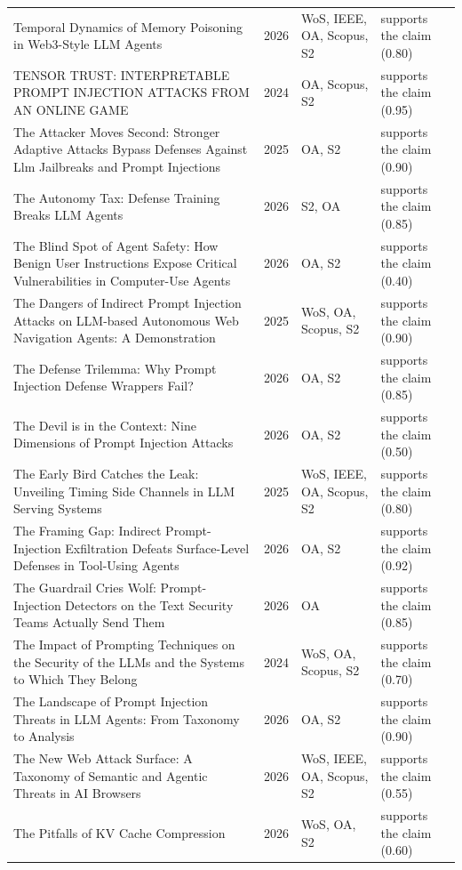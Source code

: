 \begin{longtable}{@{}%
  >{\raggedright\arraybackslash}p{}c%
  >{\raggedright\arraybackslash}p{}%
  >{\raggedright\arraybackslash}p{}@{}}
Temporal Dynamics of Memory Poisoning in Web3-Style LLM Agents & 2026 & WoS, IEEE, OA, Scopus, S2 & supports the claim (0.80) \\
TENSOR TRUST: INTERPRETABLE PROMPT INJECTION ATTACKS FROM AN ONLINE GAME & 2024 & OA, Scopus, S2 & supports the claim (0.95) \\
The Attacker Moves Second: Stronger Adaptive Attacks Bypass Defenses Against Llm Jailbreaks and Prompt Injections & 2025 & OA, S2 & supports the claim (0.90) \\
The Autonomy Tax: Defense Training Breaks LLM Agents & 2026 & S2, OA & supports the claim (0.85) \\
The Blind Spot of Agent Safety: How Benign User Instructions Expose Critical Vulnerabilities in Computer-Use Agents & 2026 & OA, S2 & supports the claim (0.40) \\
The Dangers of Indirect Prompt Injection Attacks on LLM-based Autonomous Web Navigation Agents: A Demonstration & 2025 & WoS, OA, Scopus, S2 & supports the claim (0.90) \\
The Defense Trilemma: Why Prompt Injection Defense Wrappers Fail? & 2026 & OA, S2 & supports the claim (0.85) \\
The Devil is in the Context: Nine Dimensions of Prompt Injection Attacks & 2026 & OA, S2 & supports the claim (0.50) \\
The Early Bird Catches the Leak: Unveiling Timing Side Channels in LLM Serving Systems & 2025 & WoS, IEEE, OA, Scopus, S2 & supports the claim (0.80) \\
The Framing Gap: Indirect Prompt-Injection Exfiltration Defeats Surface-Level Defenses in Tool-Using Agents & 2026 & OA, S2 & supports the claim (0.92) \\
The Guardrail Cries Wolf: Prompt-Injection Detectors on the Text Security Teams Actually Send Them & 2026 & OA & supports the claim (0.85) \\
The Impact of Prompting Techniques on the Security of the LLMs and the Systems to Which They Belong & 2024 & WoS, OA, Scopus, S2 & supports the claim (0.70) \\
The Landscape of Prompt Injection Threats in LLM Agents: From Taxonomy to Analysis & 2026 & OA, S2 & supports the claim (0.90) \\
The New Web Attack Surface: A Taxonomy of Semantic and Agentic Threats in AI Browsers & 2026 & WoS, IEEE, OA, Scopus, S2 & supports the claim (0.55) \\
The Pitfalls of KV Cache Compression & 2026 & WoS, OA, S2 & supports the claim (0.60) \\

\end{longtable}
